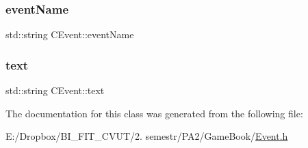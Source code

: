 \mbox{\label{class_c_event_a656665a83f6b4ab7756235588f2017e3}} 
\subsubsection{\texorpdfstring{event\+Name}{eventName}}
{\footnotesize\ttfamily std\+::string C\+Event\+::event\+Name\hspace{0.3cm}{\ttfamily [protected]}}

\mbox{\label{class_c_event_a0126916c81d39bf5a4bcd18da90b7c61}} 
\subsubsection{\texorpdfstring{text}{text}}
{\footnotesize\ttfamily std\+::string C\+Event\+::text\hspace{0.3cm}{\ttfamily [protected]}}



The documentation for this class was generated from the following file\+:\begin{DoxyCompactItemize}
\item 
E\+:/\+Dropbox/\+B\+I\+\_\+\+F\+I\+T\+\_\+\+C\+V\+U\+T/2. semestr/\+P\+A2/\+Game\+Book/\mbox{\hyperlink{_event_8h}{Event.\+h}}\end{DoxyCompactItemize}
